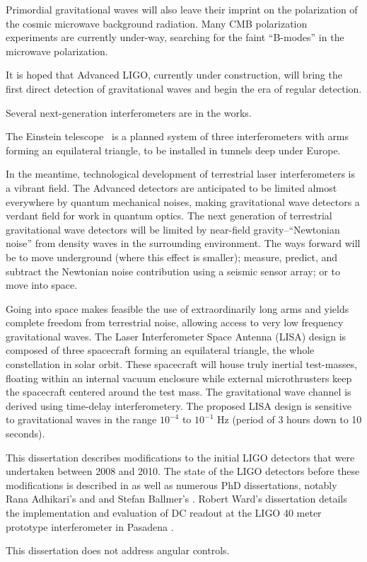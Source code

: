 Primordial gravitational waves will also leave their imprint on the
polarization of the cosmic microwave background radiation.  Many CMB
polarization experiments are currently under-way, searching for the
faint ``B-modes'' in the microwave polarization.


It is hoped that Advanced LIGO, currently under construction, will
bring the first direct detection of gravitational waves and begin the
era of regular detection.

Several next-generation interferometers are in the works. 

The Einstein telescope~\cite{EinsteinTelescopeDesignStudy2011} is a
planned system of three interferometers with arms forming an
equilateral triangle, to be installed in tunnels deep under Europe.

In the meantime, technological development of terrestrial laser
interferometers is a vibrant field.  The Advanced detectors are
anticipated to be limited almost everywhere by quantum mechanical
noises, making gravitational wave detectors a verdant field for work
in quantum optics.  The next generation of terrestrial gravitational
wave detectors will be limited by near-field gravity--``Newtonian
noise'' from density waves in the surrounding environment.  The ways
forward will be to move underground (where this effect is smaller);
measure, predict, and subtract the Newtonian noise contribution using
a seismic sensor array; or to move into space.

Going into space makes feasible the use of extraordinarily long arms
and yields complete freedom from terrestrial noise, allowing access to
very low frequency gravitational waves.  The Laser Interferometer
Space Antenna (LISA) design is composed of three spacecraft forming an
equilateral triangle, the whole constellation in solar orbit.  These
spacecraft will house truly inertial test-masses, floating within an
internal vacuum enclosure while external microthrusters keep the
spacecraft centered around the test mass.  The gravitational wave
channel is derived using time-delay interferometery.  The proposed
LISA design is sensitive to gravitational waves in the range $10^{-4}$
to $10^{-1}$ Hz (period of 3 hours down to 10 seconds).



This dissertation describes modifications to the initial LIGO
detectors that were undertaken between 2008 and 2010.  The state of
the LIGO detectors before these modifications is described in
\cite{S5InstrumentPaper} as well as numerous PhD dissertations,
notably Rana Adhikari's \cite{RanaThesis} and and Stefan Ballmer's
\cite{Ballmer2006LIGO}.  Robert Ward's dissertation details the
implementation and evaluation of DC readout at the LIGO 40 meter
prototype interferometer in Pasadena \cite{RobWardThesis}.

This dissertation does not address angular controls.
